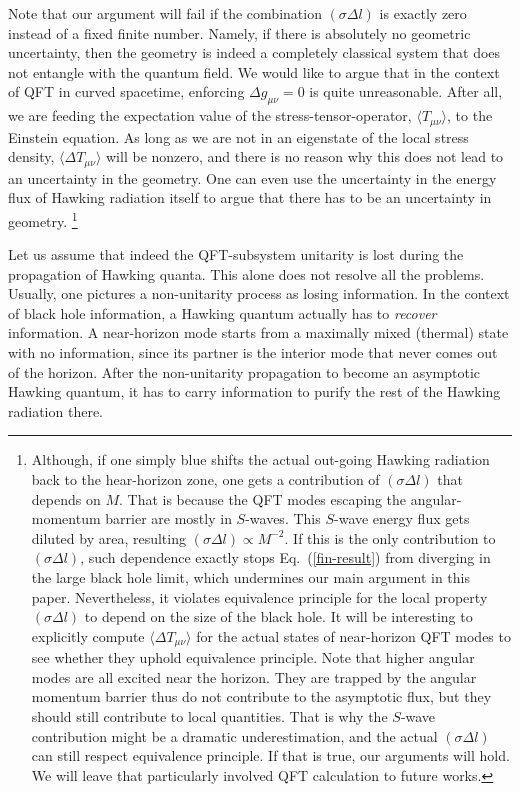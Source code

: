 \documentclass[aps,showpacs,onecolumn,floats,prd,superscriptaddress,nofootinbib]{revtex4-1}
\begin{document}
Note that our argument will fail if the combination $(\sigma\Delta l)$ is exactly zero instead of a fixed finite number.
Namely, if there is absolutely no geometric uncertainty, then the geometry is indeed a completely classical system that does not entangle with the quantum field.
We would like to argue that in the context of QFT in curved spacetime, enforcing $\Delta g_{\mu\nu}=0$ is quite unreasonable.
After all, we are feeding the expectation value of the stress-tensor-operator, $\langle T_{\mu\nu}\rangle$, to the Einstein equation. 
As long as we are not in an eigenstate of the local stress density, $\langle\Delta T_{\mu\nu}\rangle$ will be nonzero, and there is no reason why this does not lead to an uncertainty in the geometry.
One can even use the uncertainty in the energy flux of Hawking radiation itself to argue that there has to be an uncertainty in geometry.
\footnote{Although, if one simply blue shifts the actual out-going Hawking radiation back to the hear-horizon zone, one gets a contribution of $(\sigma\Delta l)$ that depends on $M$.
That is because the QFT modes escaping the angular-momentum barrier are mostly in $S$-waves.
This $S$-wave energy flux gets diluted by area, resulting $(\sigma\Delta l)\propto M^{-2}$.
If this is the only contribution to $(\sigma\Delta l)$, such dependence exactly stops Eq.~(\ref{fin-result}) from diverging in the large black hole limit, which undermines our main argument in this paper.
Nevertheless, it violates equivalence principle for the local property $(\sigma\Delta l)$ to depend on the size of the black hole.
It will be interesting to explicitly compute $\langle\Delta T_{\mu\nu}\rangle$ for the actual states of near-horizon QFT modes to see whether they uphold equivalence principle.
Note that higher angular modes are all excited near the horizon.
They are trapped by the angular momentum barrier thus do not contribute to the asymptotic flux, but they should still contribute to local quantities.
That is why the $S$-wave contribution might be a dramatic underestimation, and the actual $(\sigma\Delta l)$ can still respect equivalence principle.
If that is true, our arguments will hold.
We will leave that particularly involved QFT calculation to future works.
 }

Let us assume that indeed the QFT-subsystem unitarity is lost during the propagation of Hawking quanta.
This alone does not resolve all the problems. 
Usually, one pictures a non-unitarity process as losing information. 
In the context of black hole information, a Hawking quantum actually has to {\it recover} information. 
A near-horizon mode starts from a maximally mixed (thermal) state with no information, since its partner is the interior mode that never comes out of the horizon. 
After the non-unitarity propagation to become an asymptotic Hawking quantum, it has to carry information to purify the rest of the Hawking radiation there.
\end{document}
